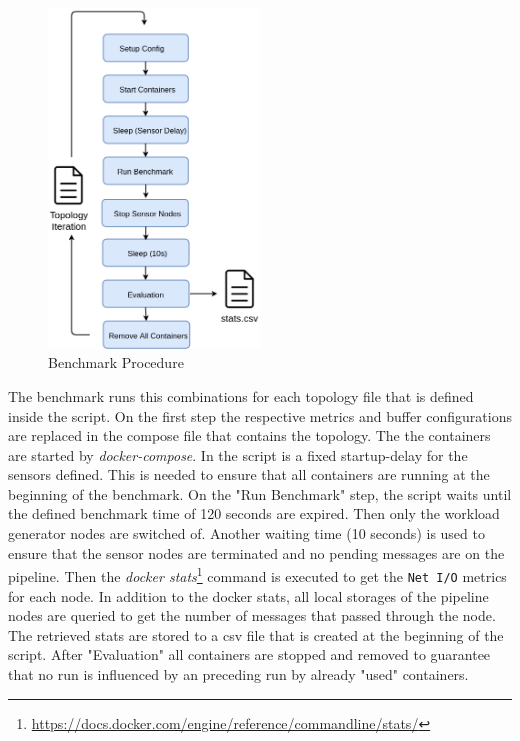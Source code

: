 \begin{figure}[H]
	\center
	\includegraphics[width=0.5\textwidth]{figures/dataoverheadsetup.png}
	\caption{Benchmark Procedure}
	\label{fig:benchmark}
\end{figure}

The benchmark runs this combinations for each topology file that is defined inside the script. On the first step the respective metrics and buffer configurations are replaced in the compose file that contains the topology.
The the containers are started by \emph{docker-compose}. In the script is a fixed startup-delay for the sensors defined. This is needed to ensure that all containers are running at the beginning of the benchmark. On the "Run Benchmark" step, the script waits until the defined benchmark time of 120 seconds are expired. Then only the workload generator nodes are switched of. Another waiting time (10 seconds) is used to ensure that the sensor nodes are terminated and no pending messages are on the pipeline. Then the \emph{docker stats}\footnote{\url{https://docs.docker.com/engine/reference/commandline/stats/}} command is executed to get the \texttt{Net I/O} metrics for each node. In addition to the docker stats, all local storages of the pipeline nodes are queried to get the number of messages that passed through the node. The retrieved stats are stored to a csv file that is created at the beginning of the script.
After "Evaluation" all containers are stopped and removed to guarantee that no run is influenced by an preceding run by already "used" containers.

